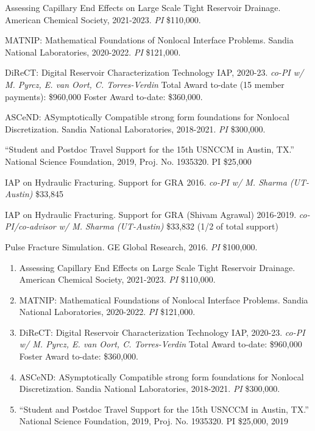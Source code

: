 \begin{etaremune}
    \item Assessing Capillary End Effects on Large Scale Tight Reservoir Drainage.  American Chemical Society, 2021-2023. \textit{PI} \$110,000.
    \item MATNIP: Mathematical Foundations of Nonlocal Interface Problems. Sandia National Laboratories, 2020-2022. \textit{PI} \$121,000. 
    \item DiReCT: Digital Reservoir Characterization Technology IAP, 2020-23. \textit{co-PI w/ M. Pyrcz, E. van Oort, C. Torres-Verdin} Total Award to-date (15 member payments): \$960,000 Foster Award to-date: \$360,000.
    \item ASCeND: ASymptotically Compatible strong form foundations for Nonlocal Discretization. Sandia National Laboratories, 2018-2021. \textit{PI} \$300,000.
    \item ``Student and Postdoc Travel Support for the 15th USNCCM in Austin, TX.''  National Science Foundation, 2019, Proj. No. 1935320. PI \$25,000
  \item IAP on Hydraulic Fracturing.  Support for GRA 2016. \textit{co-PI w/ M. Sharma (UT-Austin)} \$33,845
  \item IAP on Hydraulic Fracturing.  Support for GRA (Shivam Agrawal) 2016-2019. \textit{co-PI/co-advisor w/ M. Sharma (UT-Austin)} \$33,832 (1/2 of total support)
    \item Pulse Fracture Simulation. GE Global Research, 2016. \textit{PI} \$100,000.
\else
\begin{enumerate}
\fi
    \item Assessing Capillary End Effects on Large Scale Tight Reservoir Drainage.  American Chemical Society, 2021-2023. \textit{PI} \$110,000.
  \item MATNIP: Mathematical Foundations of Nonlocal Interface Problems. Sandia National Laboratories, 2020-2022. \textit{PI} \$121,000. 
    \item DiReCT: Digital Reservoir Characterization Technology IAP, 2020-23. \textit{co-PI w/ M. Pyrcz, E. van Oort, C. Torres-Verdin} Total Award to-date: \$960,000 Foster Award to-date: \$360,000.
  \item ASCeND: ASymptotically Compatible strong form foundations for Nonlocal Discretization. Sandia National Laboratories, 2018-2021. \textit{PI} \$300,000.
    \item ``Student and Postdoc Travel Support for the 15th USNCCM in Austin, TX.''  National Science Foundation, 2019, Proj. No. 1935320. PI \$25,000, 2019

\end{enumerate}
\end{etaremune}
